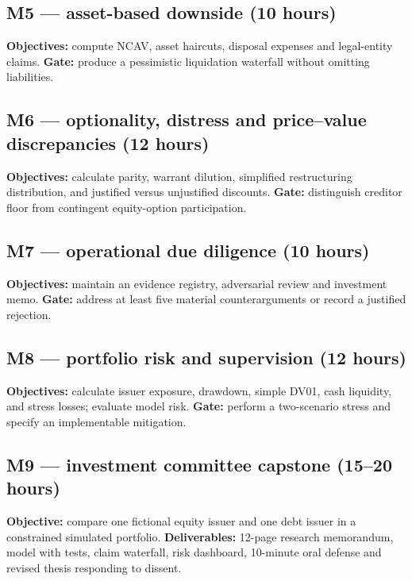 \documentclass[11pt,letterpaper]{article}
\begin{document}
\subsection{M5 --- asset-based downside (10 hours)}
\textbf{Objectives:} compute NCAV, asset haircuts, disposal expenses and legal-entity claims. \textbf{Gate:} produce a pessimistic liquidation waterfall without omitting liabilities.

\subsection{M6 --- optionality, distress and price--value discrepancies (12 hours)}
\textbf{Objectives:} calculate parity, warrant dilution, simplified restructuring distribution, and justified versus unjustified discounts. \textbf{Gate:} distinguish creditor floor from contingent equity-option participation.

\subsection{M7 --- operational due diligence (10 hours)}
\textbf{Objectives:} maintain an evidence registry, adversarial review and investment memo. \textbf{Gate:} address at least five material counterarguments or record a justified rejection.

\subsection{M8 --- portfolio risk and supervision (12 hours)}
\textbf{Objectives:} calculate issuer exposure, drawdown, simple DV01, cash liquidity, and stress losses; evaluate model risk. \textbf{Gate:} perform a two-scenario stress and specify an implementable mitigation.

\subsection{M9 --- investment committee capstone (15--20 hours)}
\textbf{Objective:} compare one fictional equity issuer and one debt issuer in a constrained simulated portfolio. \textbf{Deliverables:} 12-page research memorandum, model with tests, claim waterfall, risk dashboard, 10-minute oral defense and revised thesis responding to dissent.
\end{document}
